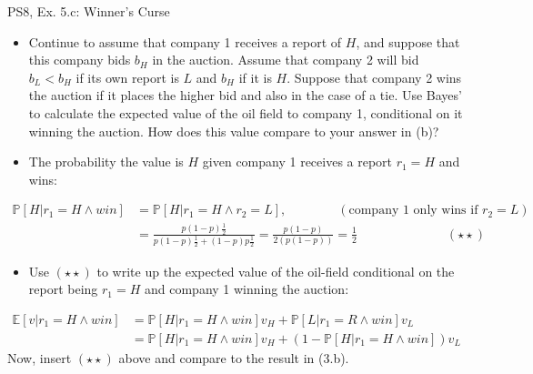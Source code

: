 \begin{frame}{PS8, Ex. 5.c: Winner's Curse}
      \begin{itemize}
        \item[(c)] Continue to assume that company 1 receives a report of $H$, and suppose that this company bids $b_H$ in the auction. Assume that company 2 will bid $b_L < b_H$ if its own report is $L$ and $b_H$ if it is $H$. Suppose that company 2 wins the auction if it places the higher bid and also in the case of a tie. Use Bayes’ to calculate the expected value of the oil field to company 1, conditional on it winning the auction. How does this value compare to your answer in (b)?
        \item[Step 1:] The probability the value is $H$ given company 1 receives a report $r_1=H$ and wins:
        \end{itemize}
        \vspace{-8pt}
        \begin{align*}
          \mathbb{P}[H|r_1=H\wedge win]&=\mathbb{P}[H|r_1=H\wedge r_2=L],\quad\quad\quad\quad(\text{company 1 only wins if }r_2=L)\\
            &=\frac{p(1-p)\frac{1}{2}}{p(1-p)\frac{1}{2}+(1-p)p\frac{1}{2}}=\frac{p(1-p)}{2(p(1-p))}=\frac{1}{2}\quad\quad\quad\quad\quad\quad\quad(\star\star)
        \end{align*}
        \vspace{-8pt}
        \begin{itemize}
        \item[Step 2:] Use $(\star\star)$ to write up the expected value of the oil-field conditional on the report being $r_1=H$ and company 1 winning the auction:
      \end{itemize}
      \vspace{-4pt}
      \begin{align*}
        \mathbb{E}[v|r_1=H\wedge win]&=\mathbb{P}[H|r_1=H\wedge win]v_H+\mathbb{P}[L|r_1=R\wedge win]v_L\\
        &=\mathbb{P}[H|r_1=H\wedge win]v_H+\left(1-\mathbb{P}[H|r_1=H\wedge win]\right)v_L
      \end{align*}
      Now, insert $(\star\star)$ above and compare to the result in (3.b).
      \vfill\null
\end{frame}
